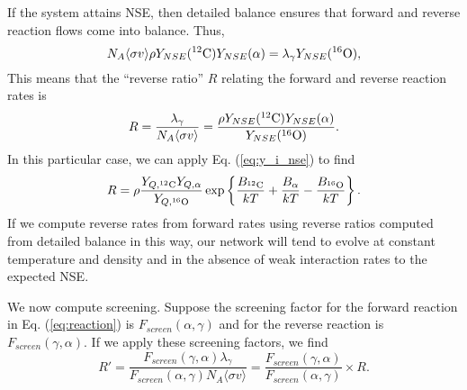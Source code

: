 \documentclass{article}    %
\begin{document}
If the system attains NSE, then detailed balance ensures that forward and
reverse reaction flows come into balance.  Thus, 
\begin{equation}
N_A \langle \sigma v \rangle \rho Y_{NSE}(^{12}{\rm C}) Y_{NSE}(\alpha )
= \lambda_\gamma Y_{NSE}(^{16}{\rm O}),  \label{eq:diffeqNse}
\end{equation}
This means that the ``reverse ratio'' $R$ relating the forward and reverse
reaction rates is
\begin{equation}
R = \frac{\lambda_\gamma}{N_A \langle \sigma v \rangle} = 
\frac{\rho Y_{NSE}(^{12}{\rm C}) Y_{NSE}(\alpha )}{Y_{NSE}(^{16}{\rm O})}.
\label{eq:RevRatio}
\end{equation}
In this particular case, we can apply Eq. (\ref{eq:y_i_nse}) to find
\begin{equation}
R = \rho\frac{Y_{Q,^{12}{\rm C}} Y_{Q,\alpha}}{Y_{Q,^{16}{\rm O}}}
\exp\left\{\frac{B_{^{12}{\rm C}}}{kT} + \frac{B_{\alpha}}{kT}
- \frac{B_{^{16}{\rm O}}}{kT}\right\}.
\label{eq:RevRatio2}
\end{equation} 
If we compute reverse rates from forward rates using reverse ratios computed
from detailed balance in this way, our network will tend to evolve at
constant temperature and density and
in the absence of weak interaction rates to the expected NSE.

We now compute screening.  Suppose the screening factor for the forward reaction
in Eq. (\ref{eq:reaction}) is $F_{screen}(\alpha,\gamma)$ and for the reverse
reaction is $F_{screen}(\gamma,\alpha)$.
If we apply these screening factors, we find
\begin{equation}
R' = \frac{F_{screen}(\gamma,\alpha) \lambda_\gamma}{F_{screen}(\alpha,\gamma) N_A \langle \sigma v \rangle } =
\frac{F_{screen}(\gamma,\alpha)}{F_{screen}(\alpha,\gamma)}
\times R.
\label{eq:RevRatioNew}
\end{equation}
\end{document}
